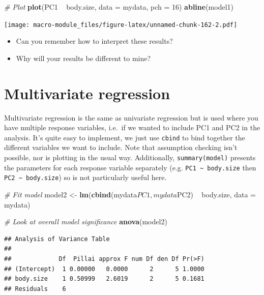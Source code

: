 \documentclass[]{book}
\newenvironment{Shaded}{\begin{snugshade}}{\end{snugshade}}
\newcommand{\KeywordTok}[1]{\textcolor[rgb]{0.13,0.29,0.53}{\textbf{{#1}}}}
\newcommand{\DataTypeTok}[1]{\textcolor[rgb]{0.13,0.29,0.53}{{#1}}}
\newcommand{\DecValTok}[1]{\textcolor[rgb]{0.00,0.00,0.81}{{#1}}}
\newcommand{\StringTok}[1]{\textcolor[rgb]{0.31,0.60,0.02}{{#1}}}
\newcommand{\CommentTok}[1]{\textcolor[rgb]{0.56,0.35,0.01}{\textit{{#1}}}}
\newcommand{\NormalTok}[1]{{#1}}
\providecommand{\tightlist}{%
  \setlength{\itemsep}{0pt}\setlength{\parskip}{0pt}}
\theoremstyle{definition}
\theoremstyle{definition}
\theoremstyle{definition}
\theoremstyle{remark}
\begin{document}
\begin{Shaded}
\begin{Highlighting}[]
\CommentTok{# Plot}
\KeywordTok{plot}\NormalTok{(PC1 ~}\StringTok{ }\NormalTok{body.size, }\DataTypeTok{data =} \NormalTok{mydata, }\DataTypeTok{pch =} \DecValTok{16}\NormalTok{)}
\KeywordTok{abline}\NormalTok{(model1)}
\end{Highlighting}
\end{Shaded}

\texttt{[image: macro-module\_files/figure-latex/unnamed-chunk-162-2.pdf]}

\begin{itemize}
\tightlist
\item
  Can you remember how to interpret these results?
\item
  Why will your results be different to mine?
\end{itemize}

\section{Multivariate regression}\label{multivariate-regression}

Multivariate regression is the same as univariate regression but is used
where you have multiple response variables, i.e.~if we wanted to include
PC1 and PC2 in the analysis. It's quite easy to implement, we just use
\texttt{cbind} to bind together the different variables we want to
include. Note that assumption checking isn't possible, nor is plotting
in the usual way. Additionally, \texttt{summary(model)} presents the
parameters for each response variable separately (e.g.
\texttt{PC1\ \textasciitilde{}\ body.size} then
\texttt{PC2\ \textasciitilde{}\ body.size}) so is not particularly
useful here.

\begin{Shaded}
\begin{Highlighting}[]
\CommentTok{# Fit model}
\NormalTok{model2 <-}\StringTok{ }\KeywordTok{lm}\NormalTok{(}\KeywordTok{cbind}\NormalTok{(mydata$PC1,mydata$PC2) ~}\StringTok{ }\NormalTok{body.size, }\DataTypeTok{data =} \NormalTok{mydata)}

\CommentTok{# Look at overall model significance}
\KeywordTok{anova}\NormalTok{(model2)}
\end{Highlighting}
\end{Shaded}

\begin{verbatim}
## Analysis of Variance Table
## 
##             Df  Pillai approx F num Df den Df Pr(>F)
## (Intercept)  1 0.00000   0.0000      2      5 1.0000
## body.size    1 0.50999   2.6019      2      5 0.1681
## Residuals    6
\end{verbatim}
\end{document}
